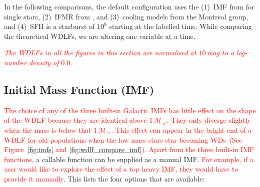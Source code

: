 \documentclass[fleqn,usenatbib]{rasti}
\newcommand{\msun}{\mathcal{M}_{\sun}}
\begin{document}
In the following comparisons, the default configuration uses the (1)~IMF
from \citet{2003PASP..115..763C} for single stars, (2)~IFMR from
\citet{2008MNRAS.387.1693C}, and (3)~cooling models from the Montreal group,
and (4)~SFH is a starburst of $10^8$ starting at the labelled time.
While comparing the theoretical WDLFs, we are altering one variable at a time.

\textcolor{red}{\textit{The WDLFs in all the figures in this section are
normalised at $10$\,mag to a log-number density of $0.0$.}}


\subsection{Initial Mass Function (IMF)}
\textcolor{red}{The choice of any of the three built-in Galactic IMFs has little
effect on the shape of the WDLF because they are identical above $1\,\msun$.
They only diverge slightly when the mass is below that $1\,\msun$. This effect
can appear in the bright end of a WDLF for old populations when the low mass
stars star becoming WDs~(See Figure~\ref{fig:imfs} and
\ref{fig:wdlf_compare_imf}). Apart from the three built-in IMF functions}, a
callable function can be supplied as a manual IMF. \textcolor{red}{For
example, if a user would like to explore the effect of a top heavy IMF, they
would have to provide it manually}. This lists the four options that are
available:
\end{document}
